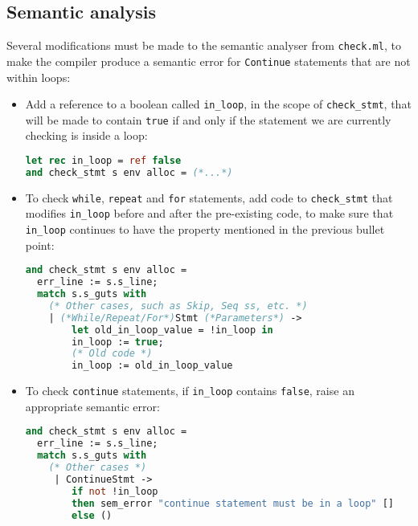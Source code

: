 \documentclass[a4paper,10pt]{article}
\begin{document}
\subsection{Semantic analysis}
Several modifications must be made to the semantic analyser from \texttt{check.ml}, to make the compiler produce a semantic error for \texttt{Continue} statements that are not within loops:
\begin{itemize}
    \item Add a reference to a boolean called \texttt{in\_loop}, in the scope of \texttt{check\_stmt}, that will be made to contain \texttt{true} if and only if the statement we are currently checking is inside a loop:
\begin{lstlisting}[language=ml]
let rec in_loop = ref false
and check_stmt s env alloc = (*...*)
\end{lstlisting}

\item To check \texttt{while}, \texttt{repeat} and \texttt{for} statements, add code to \texttt{check\_stmt} that modifies \texttt{in\_loop} before and after the pre-existing code, to make sure that \texttt{in\_loop} continues to have the property mentioned in the previous bullet point:
\begin{lstlisting}[language=ml]
and check_stmt s env alloc =
  err_line := s.s_line;
  match s.s_guts with
    (* Other cases, such as Skip, Seq ss, etc. *)
    | (*While/Repeat/For*)Stmt (*Parameters*) ->
        let old_in_loop_value = !in_loop in
        in_loop := true;
        (* Old code *)
        in_loop := old_in_loop_value
\end{lstlisting}
\item To check \texttt{continue} statements, if \texttt{in\_loop} contains \texttt{false}, raise an appropriate semantic error:
\begin{lstlisting}[language=ml]
and check_stmt s env alloc =
  err_line := s.s_line;
  match s.s_guts with
    (* Other cases *)
     | ContinueStmt ->
        if not !in_loop
        then sem_error "continue statement must be in a loop" []
        else ()
\end{lstlisting}
\end{itemize}
\end{document}
